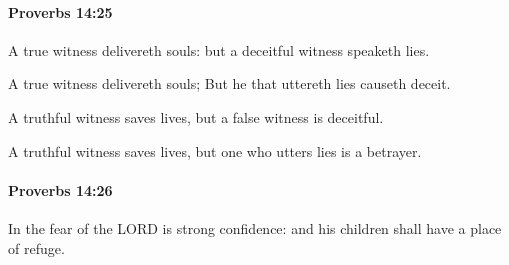 		\paragraph{Proverbs 14:25} %
			\label{PROVERBS-14-25}

			A true witness delivereth souls: but a deceitful witness speaketh lies.

			\begin{versebox}
					\item[BHS] 
					\item[ASV] A true witness delivereth souls; But he that uttereth lies causeth deceit.
					\item[NIV] A truthful witness saves lives, but a false witness is deceitful.
					\item[NRSV] A truthful witness saves lives, but one who utters lies is a betrayer.
			\end{versebox}

		\paragraph{Proverbs 14:26} %
			\label{PROVERBS-14-26}

			In the fear of the LORD is strong confidence: and his children shall have a place of refuge.

